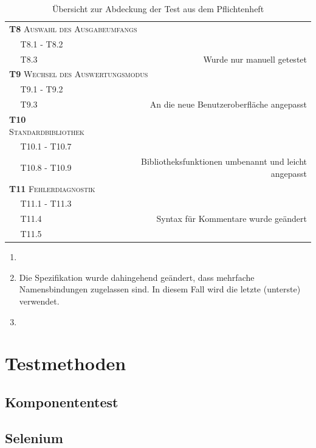 \documentclass[parskip=full,11pt,openany]{scrreprt}
\newcommand{\cmark}{\ding{51}}%
\newcommand{\xmark}{\ding{55}}%
\begin{document}
\begin{table}[h]
\begin{tabular}{@{}ll|c|r@{}}
		\multicolumn{4}{l}{\small \textsc{\textbf{T8} Auswahl des Ausgabeumfangs}}\\ 
		&T8.1 - T8.2 & \cmark & \\
		&T8.3 & \xmark & Wurde nur manuell getestet \\ %
		\multicolumn{4}{l}{\small \textsc{\textbf{T9} Wechsel des Auswertungsmodus}}\\ 
		&T9.1 - T9.2 & \cmark & \\
		&T9.3 & \cmark & An die neue Benutzeroberfläche angepasst \\
		\multicolumn{3}{l|}{\small \textsc{\textbf{T10} Standardbibliothek}}\\ 
		&T10.1 - T10.7 & \cmark & \\
		&T10.8 - T10.9 & \cmark & Bibliotheksfunktionen umbenannt und leicht angepasst \\
		\multicolumn{3}{l|}{\small \textsc{\textbf{T11} Fehlerdiagnostik}}\\ 
		&T11.1 - T11.3 & \cmark & \\
		&T11.4 & \cmark & Syntax für Kommentare wurde geändert \\
		&T11.5 & \cmark & \\
		\bottomrule
	\end{tabular}
	\caption{Übersicht zur Abdeckung der Test aus dem Pflichtenheft}
\end{table}

\begin{enumerate}
\item 
\item Die Spezifikation wurde dahingehend geändert, dass mehrfache Namensbindungen zugelassen sind. In diesem Fall wird die letzte (unterste) verwendet.
\item 
\end{enumerate}


\chapter{Testmethoden}

\section{Komponententest}

\section{Selenium}
\end{document}
